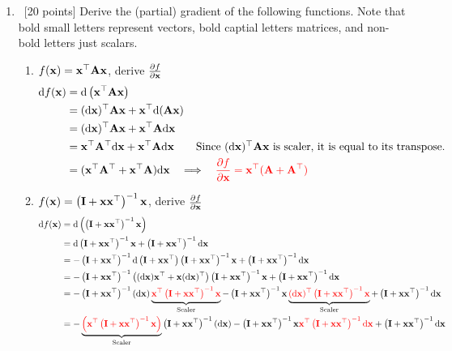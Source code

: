 \documentclass[12pt, fullpage,letterpaper]{article}
\def\red{\color{red}}
\def\blackblue{\color{black!40!blue}}
\begin{document}
\begin{enumerate}
\item~[20 points] Derive the (partial) gradient of the following functions. Note that bold small letters represent vectors, bold captial letters matrices, and non-bold letters just scalars.
\begin{enumerate}
	\item $f({\bf x}) = {\bf x}^\top {\bf A} {\bf x}$, derive $\frac{\partial f}{\partial {\bf x}}$
	{\blackblue\noindent  
	\begin{align*}
	\d f(\x) & = \d \left(\x^\top \A \x\right)\\
	& = (\d \x)^\top  \A \x + \x^\top \d(\A \x)\\
	& = (\d \x)^\top  \A \x + \x^\top \A \d \x\\
	& = \x^\top \A^\top \d \x + \x^\top \A \d \x \quad\quad\mbox{Since $(\d \x)^\top  \A \x$ is scaler, it is equal to its transpose.}\\
	& =  (\x^\top \A^\top + \x^\top \A) \d \x \quad\Longrightarrow \quad {\red \frac{\partial f}{\partial \x} =   \x^\top (\A + \A^\top)}
	\end{align*}}
	\item $f({\bf x})  = \left({\bf I} + {\bf x}{\bf x}^\top\right)^{-1} {\bf x}$, derive $\frac{\partial f}{\partial {\bf x}}$\\
	{\blackblue \noindent
	\begin{align*}
	\d f(\x) & =\d \left(\left(\I + \x\x^\top\right)^{-1} \x\right)\\
	& = \d \left(\I + \x\x^\top\right)^{-1} \x + \left(\I + \x\x^\top\right)^{-1} \d\x\\
	& = - \left(\I + \x\x^\top\right)^{-1} \d \left(\I + \x\x^\top\right) \left(\I + \x\x^\top\right)^{-1} \x + \left(\I + \x\x^\top\right)^{-1} \d\x\\
	& = - \left(\I + \x\x^\top\right)^{-1} \left((\d\x)\x^\top +\x(\d \x)^\top\right) \left(\I + \x\x^\top\right)^{-1} \x + \left(\I + \x\x^\top\right)^{-1} \d\x\\
	& =  - \left(\I + \x\x^\top\right)^{-1} (\d\x)\underbrace{\red\x^\top  \left(\I + \x\x^\top\right)^{-1} \x}_\text{Scaler} -
	 \left(\I + \x\x^\top\right)^{-1}  \x\underbrace{{\red(\d \x)^\top \left(\I + \x\x^\top\right)^{-1} \x}}_\text{Scaler}
	 + \left(\I + \x\x^\top\right)^{-1} \d\x\\
	& =  - \underbrace{\red\left(\x^\top  \left(\I + \x\x^\top\right)^{-1} \x\right)}_\text{Scaler}\left(\I + \x\x^\top\right)^{-1} (\d\x) -
	 \left(\I + \x\x^\top\right)^{-1}  \x{\red\x^\top \left(\I + \x\x^\top\right)^{-1} \d \x}
	 + \left(\I + \x\x^\top\right)^{-1} \d\x\\

\end{align*}}
\end{enumerate}
\end{enumerate}
\end{document}
